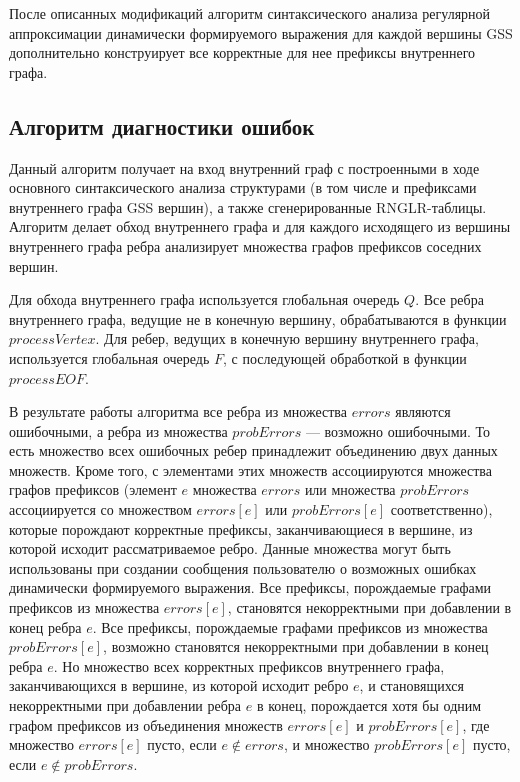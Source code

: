 После описанных модификаций алгоритм синтаксического анализа регулярной аппроксимации динамически формируемого выражения для каждой вершины GSS дополнительно конструирует все корректные для нее префиксы внутреннего графа.

\subsection{Алгоритм диагностики ошибок}
Данный алгоритм получает на вход внутренний граф с построенными в ходе основного синтаксического анализа структурами (в том числе и префиксами внутреннего графа GSS вершин), а также сгенерированные RNGLR-таблицы. Алгоритм делает обход внутреннего графа и для каждого исходящего из вершины внутреннего графа ребра анализирует множества графов префиксов соседних вершин. 

Для обхода внутреннего графа используется глобальная очередь $Q$. Все ребра внутреннего графа, ведущие не в конечную вершину, обрабатываются в функции $processVertex$. Для ребер, ведущих в конечную вершину внутреннего графа, используется глобальная очередь $F$, с последующей обработкой в функции $processEOF$.

В результате работы алгоритма все ребра из множества $errors$ являются ошибочными, а ребра из множества $probErrors$ --- возможно ошибочными. То есть множество всех ошибочных ребер принадлежит объединению двух данных множеств. Кроме того, с элементами этих множеств ассоциируются множества графов префиксов (элемент $e$ множества $errors$ или множества $probErrors$ ассоциируется со множеством $errors[e]$ или $probErrors[e]$ соответственно), которые порождают корректные префиксы, заканчивающиеся в вершине, из которой исходит рассматриваемое ребро. Данные множества могут быть использованы при создании сообщения пользователю о возможных ошибках динамически формируемого выражения. Все префиксы, порождаемые графами префиксов из множества $errors[e]$, становятся некорректными при добавлении в конец ребра $e$. Все префиксы, порождаемые графами префиксов из множества $probErrors[e]$, возможно становятся некорректными при добавлении в конец ребра $e$. Но множество всех корректных префиксов внутреннего графа, заканчивающихся в вершине, из которой исходит ребро $e$, и становящихся некорректными при добавлении ребра $e$ в конец, порождается хотя бы одним графом префиксов из объединения множеств $errors[e]$ и $probErrors[e]$, где множество $errors[e]$ пусто, если $e \notin errors$, и множество $probErrors[e]$ пусто, если $e \notin probErrors$.

